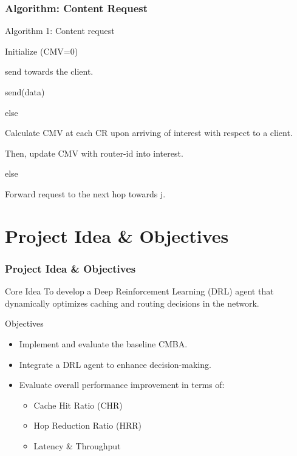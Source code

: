 \documentclass{beamer}
\begin{document}
\begin{frame}[fragile]
    \frametitle{Algorithm: Content Request}
    \begin{block}{Algorithm 1: Content request}
    \begin{algorithmic}[1]
        \State Initialize (CMV=0)
        
        
            
                \State send towards the client.
                
                \State send(data)
                
            \Else else
            
                \State      Calculate CMV at each CR upon arriving of interest with respect to a client.
                
                
                    \State Then, update CMV with router-id into interest.
                    
                \Else else
                
                    \State Forward request to the next hop towards j.
                \EndIf
            \EndIf
        \EndFor
    \end{algorithmic}
    \end{block}
\end{frame}

\section{Project Idea \& Objectives}
\begin{frame}
  \frametitle{Project Idea \& Objectives}
  \begin{block}{Core Idea}
    To develop a Deep Reinforcement Learning (DRL) agent that dynamically optimizes caching and routing decisions in the network.
  \end{block}
  \begin{block}{Objectives}
    \begin{itemize}
        \item Implement and evaluate the baseline CMBA.
        \item Integrate a DRL agent to enhance decision-making.
        \item Evaluate overall performance improvement in terms of:
        \begin{itemize}
            \item Cache Hit Ratio (CHR)
            \item Hop Reduction Ratio (HRR)
            \item Latency \& Throughput
        \end{itemize}
    \end{itemize}
  \end{block}
\end{frame}
\end{document}
